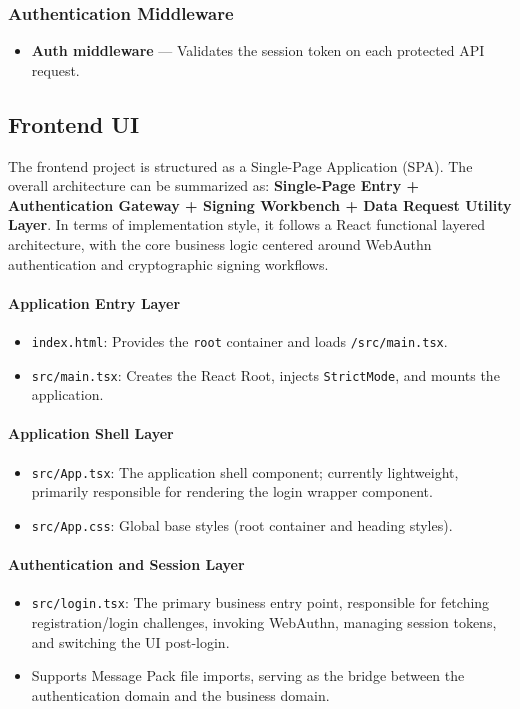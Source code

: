 \documentclass[letterpaper,11pt]{article}
\begin{document}
\subsubsection*{Authentication Middleware}
\begin{itemize}
    \item \textbf{Auth middleware} --- Validates the session token on each protected API request.
\end{itemize}

\subsection{Frontend UI}

The frontend project is structured as a Single-Page Application (SPA). The overall architecture can be summarized as: \textbf{Single-Page Entry + Authentication Gateway + Signing Workbench + Data Request Utility Layer}.
In terms of implementation style, it follows a React functional layered architecture, with the core business logic centered around WebAuthn authentication and cryptographic signing workflows.

\paragraph{Application Entry Layer}
\begin{itemize}[leftmargin=2em]
    \item \texttt{index.html}: Provides the \texttt{root} container and loads \texttt{/src/main.tsx}.
    \item \texttt{src/main.tsx}: Creates the React Root, injects \texttt{StrictMode}, and mounts the application.
\end{itemize}

\paragraph{Application Shell Layer}
\begin{itemize}[leftmargin=2em]
    \item \texttt{src/App.tsx}: The application shell component; currently lightweight, primarily responsible for rendering the login wrapper component.
    \item \texttt{src/App.css}: Global base styles (root container and heading styles).
\end{itemize}

\paragraph{Authentication and Session Layer}
\begin{itemize}[leftmargin=2em]
    \item \texttt{src/login.tsx}: The primary business entry point, responsible for fetching registration/login challenges, invoking WebAuthn, managing session tokens, and switching the UI post-login.
    \item Supports Message Pack file imports, serving as the bridge between the authentication domain and the business domain.
\end{itemize}
\end{document}
